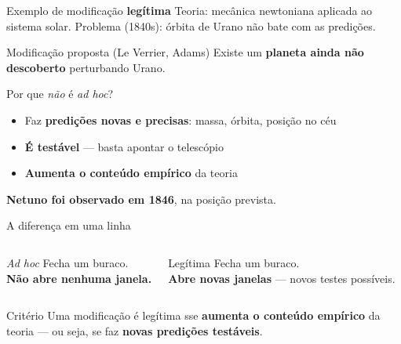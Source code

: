 \documentclass[aspectratio=169]{beamer}
\newcommand{\impt}[1]{\textcolor{maccent}{\textbf{#1}}}
\newcommand{\ntc}[1]{\textcolor{mprimary}{#1}}
\begin{document}
\begin{frame}{Exemplo de modificação \impt{legítima}}
\ntc{Teoria:} mecânica newtoniana aplicada ao sistema solar.
\pause
\vspace{0.3cm}
\ntc{Problema (1840s):} órbita de Urano não bate com as predições.
\pause
\vspace{0.4cm}
\begin{block}{Modificação proposta (Le Verrier, Adams)}
Existe um \impt{planeta ainda não descoberto} perturbando Urano.
\end{block}
\pause
\vspace{0.3cm}
\ntc{Por que \emph{não} é \emph{ad hoc}?}
\begin{itemize}
  \item Faz \impt{predições novas e precisas}: massa, órbita, posição no céu
  \pause
  \item \impt{É testável} --- basta apontar o telescópio
  \pause
  \item \impt{Aumenta o conteúdo empírico} da teoria
\end{itemize}
\pause
\vspace{0.3cm}
\begin{alertblock}{}
\impt{Netuno foi observado em 1846}, na posição prevista.
\end{alertblock}
\end{frame}

\begin{frame}{A diferença em uma linha}
\begin{columns}[t]
\begin{alertblock}{\emph{Ad hoc}}
Fecha um buraco. \\[0.2cm]
\impt{Não abre nenhuma janela.}
\end{alertblock}

\pause
\begin{block}{Legítima}
Fecha um buraco. \\[0.2cm]
\impt{Abre novas janelas} --- novos testes possíveis.
\end{block}
\end{columns}
\pause
\vspace{0.6cm}
\begin{block}{Critério}
Uma modificação é legítima sse \impt{aumenta o conteúdo empírico} da teoria --- ou seja, se faz \impt{novas predições testáveis}.
\end{block}
\end{frame}
\end{document}
